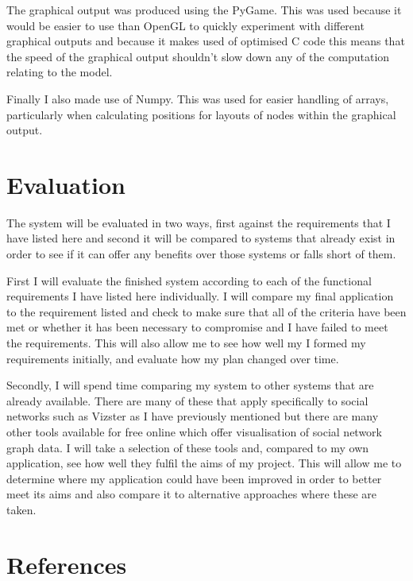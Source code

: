 \documentclass[12pt,a4paper]{article}
\begin{document}
The graphical output was produced using the PyGame. This was used because it would be easier to use than OpenGL to quickly experiment with different graphical outputs and because it makes used of optimised C code this means that the speed of the graphical output shouldn't slow down any of the computation relating to the model.

Finally I also made use of Numpy. This was used for easier handling of arrays, particularly when calculating positions for layouts of nodes within the graphical output.

\section{Evaluation}
The system will be evaluated in two ways, first against the requirements that I have listed here and second it will be compared to systems that already exist in order to see if it can offer any benefits over those systems or falls short of them.

First I will evaluate the finished system according to each of the functional requirements I have listed here individually. I will compare my final application to the requirement listed and check to make sure that all of the criteria have been met or whether it has been necessary to compromise and I have failed to meet the requirements. This will also allow me to see how well my I formed my requirements initially, and evaluate how my plan changed over time.

Secondly, I will spend time comparing my system to other systems that are already available. There are many of these that apply specifically to social networks such as Vizster as I have previously mentioned but there are many other tools available for free online which offer visualisation of social network graph data. I will take a selection of these tools and, compared to my own application, see how well they fulfil the aims of my project. This will allow me to determine where my application could have been improved in order to better meet its aims and also compare it to alternative approaches where these are taken.

\section{References}


\end{document}
